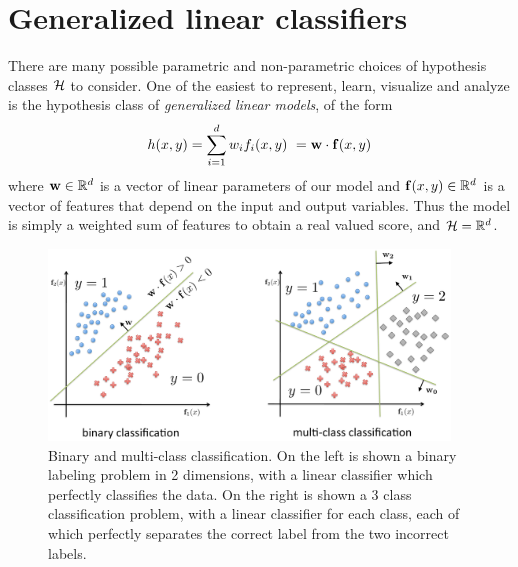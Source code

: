 

\section{Generalized linear classifiers}\label{sec:glms}
There are many possible parametric and non-parametric choices of hypothesis 
classes $\mathcal{H}$ to consider.  One of the easiest to represent, learn, visualize 
and analyze is the hypothesis class of {\em generalized linear models}, of the 
form
\begin{equation}
h(x,y) = \sum_{i=1}^d w_i f_i(x,y)\ = \mathbf{w} \cdot \mathbf{f}(x,y) \end{equation}
where $\mathbf{w} \in \mathbb{R}^d$ is a vector of linear parameters of our model and 
$\mathbf{f}(x,y) \in \mathbb{R}^d$ is a vector of features that depend on the input and 
output variables.  Thus the model is simply a weighted sum of features to 
obtain a real valued score, and $\mathcal{H} = \mathbb{R}^d$.


\begin{figure}[tb]
\begin{center}
\includegraphics[width=0.95\textwidth]{figs/binary-multiclass-ml.pdf}
\caption[Binary and multi-class linear classification.]{Binary and multi-class classification.  On the left is shown a binary labeling problem in 2 dimensions, with a linear classifier which perfectly classifies the data.  On the right is shown a 3 class classification problem, with a linear classifier for each class, each of which perfectly separates the correct label from the two incorrect labels.}
\label{fig:binary-multiclass-ml}
\end{center}
\end{figure}


